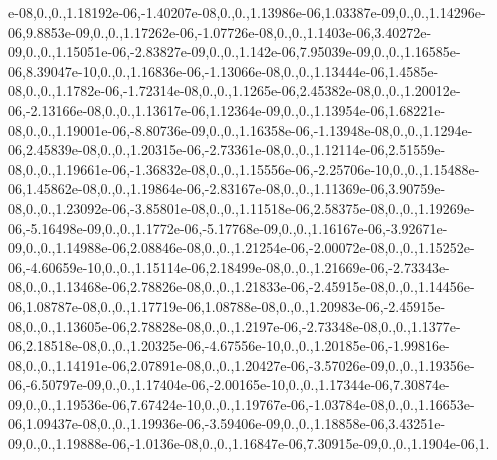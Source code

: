 \begin{DoxyCompactItemize}
e-\/08,0.,0.,1.\-18192e-\/06,-\/1.\-40207e-\/08,0.,0.,1.\-13986e-\/06,1.\-03387e-\/09,0.,0.,1.\-14296e-\/06,9.\-8853e-\/09,0.,0.,1.\-17262e-\/06,-\/1.\-07726e-\/08,0.,0.,1.\-1403e-\/06,3.\-40272e-\/09,0.,0.,1.\-15051e-\/06,-\/2.\-83827e-\/09,0.,0.,1.\-142e-\/06,7.\-95039e-\/09,0.,0.,1.\-16585e-\/06,8.\-39047e-\/10,0.,0.,1.\-16836e-\/06,-\/1.\-13066e-\/08,0.,0.,1.\-13444e-\/06,1.\-4585e-\/08,0.,0.,1.\-1782e-\/06,-\/1.\-72314e-\/08,0.,0.,1.\-1265e-\/06,2.\-45382e-\/08,0.,0.,1.\-20012e-\/06,-\/2.\-13166e-\/08,0.,0.,1.\-13617e-\/06,1.\-12364e-\/09,0.,0.,1.\-13954e-\/06,1.\-68221e-\/08,0.,0.,1.\-19001e-\/06,-\/8.\-80736e-\/09,0.,0.,1.\-16358e-\/06,-\/1.\-13948e-\/08,0.,0.,1.\-1294e-\/06,2.\-45839e-\/08,0.,0.,1.\-20315e-\/06,-\/2.\-73361e-\/08,0.,0.,1.\-12114e-\/06,2.\-51559e-\/08,0.,0.,1.\-19661e-\/06,-\/1.\-36832e-\/08,0.,0.,1.\-15556e-\/06,-\/2.\-25706e-\/10,0.,0.,1.\-15488e-\/06,1.\-45862e-\/08,0.,0.,1.\-19864e-\/06,-\/2.\-83167e-\/08,0.,0.,1.\-11369e-\/06,3.\-90759e-\/08,0.,0.,1.\-23092e-\/06,-\/3.\-85801e-\/08,0.,0.,1.\-11518e-\/06,2.\-58375e-\/08,0.,0.,1.\-19269e-\/06,-\/5.\-16498e-\/09,0.,0.,1.\-1772e-\/06,-\/5.\-17768e-\/09,0.,0.,1.\-16167e-\/06,-\/3.\-92671e-\/09,0.,0.,1.\-14988e-\/06,2.\-08846e-\/08,0.,0.,1.\-21254e-\/06,-\/2.\-00072e-\/08,0.,0.,1.\-15252e-\/06,-\/4.\-60659e-\/10,0.,0.,1.\-15114e-\/06,2.\-18499e-\/08,0.,0.,1.\-21669e-\/06,-\/2.\-73343e-\/08,0.,0.,1.\-13468e-\/06,2.\-78826e-\/08,0.,0.,1.\-21833e-\/06,-\/2.\-45915e-\/08,0.,0.,1.\-14456e-\/06,1.\-08787e-\/08,0.,0.,1.\-17719e-\/06,1.\-08788e-\/08,0.,0.,1.\-20983e-\/06,-\/2.\-45915e-\/08,0.,0.,1.\-13605e-\/06,2.\-78828e-\/08,0.,0.,1.\-2197e-\/06,-\/2.\-73348e-\/08,0.,0.,1.\-1377e-\/06,2.\-18518e-\/08,0.,0.,1.\-20325e-\/06,-\/4.\-67556e-\/10,0.,0.,1.\-20185e-\/06,-\/1.\-99816e-\/08,0.,0.,1.\-14191e-\/06,2.\-07891e-\/08,0.,0.,1.\-20427e-\/06,-\/3.\-57026e-\/09,0.,0.,1.\-19356e-\/06,-\/6.\-50797e-\/09,0.,0.,1.\-17404e-\/06,-\/2.\-00165e-\/10,0.,0.,1.\-17344e-\/06,7.\-30874e-\/09,0.,0.,1.\-19536e-\/06,7.\-67424e-\/10,0.,0.,1.\-19767e-\/06,-\/1.\-03784e-\/08,0.,0.,1.\-16653e-\/06,1.\-09437e-\/08,0.,0.,1.\-19936e-\/06,-\/3.\-59406e-\/09,0.,0.,1.\-18858e-\/06,3.\-43251e-\/09,0.,0.,1.\-19888e-\/06,-\/1.\-0136e-\/08,0.,0.,1.\-16847e-\/06,7.\-30915e-\/09,0.,0.,1.\-1904e-\/06,1.
\end{DoxyCompactItemize}
